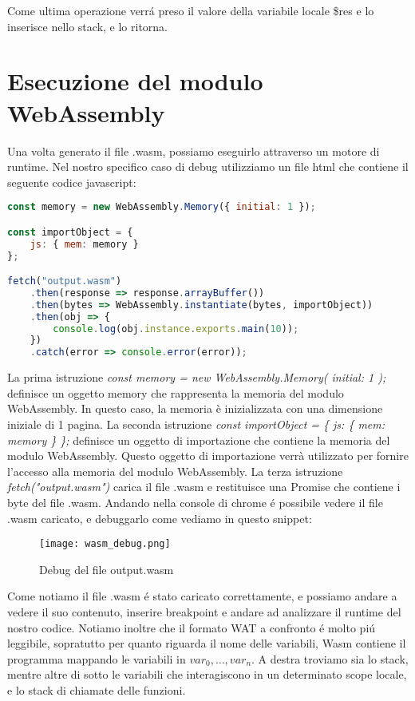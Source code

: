 \documentclass[../../main.tex]{subfiles}
\begin{document}
Come ultima operazione verrá preso il valore della variabile locale \$res e lo inserisce nello stack, e lo ritorna.

\section{Esecuzione del modulo WebAssembly}
Una volta generato il file .wasm, possiamo eseguirlo attraverso un motore di runtime. Nel nostro specifico caso di debug utilizziamo un file html che contiene il seguente codice javascript:
\begin{lstlisting}[language=Javascript, caption={Esecuzione del modulo WebAssembly}, label={lst:esecuzioneWasm}]
const memory = new WebAssembly.Memory({ initial: 1 });

const importObject = {
    js: { mem: memory }
};

fetch("output.wasm")
    .then(response => response.arrayBuffer())
    .then(bytes => WebAssembly.instantiate(bytes, importObject))
    .then(obj => {
        console.log(obj.instance.exports.main(10));
    })
    .catch(error => console.error(error));

\end{lstlisting}

La prima istruzione \textit{const memory = new WebAssembly.Memory({ initial: 1 });} definisce un oggetto memory che rappresenta la memoria del modulo WebAssembly. In questo caso, la memoria è inizializzata con una dimensione iniziale di 1 pagina.
La seconda istruzione \textit{const importObject = \{ js: \{ mem: memory \} \};} definisce un oggetto di importazione che contiene la memoria del modulo WebAssembly. Questo oggetto di importazione verrà utilizzato per fornire l'accesso alla memoria del modulo WebAssembly.
La terza istruzione \textit{fetch("output.wasm")} carica il file .wasm e restituisce una Promise che contiene i byte del file .wasm.
Andando nella console di chrome é possibile vedere il file .wasm caricato, e debuggarlo come vediamo in questo snippet:
\begin{figure}[H]
    \centering
    \texttt{[image: wasm\_debug.png]}
    \caption{Debug del file output.wasm}
    \label{fig:wasm_debug}
\end{figure}
Come notiamo il file .wasm é stato caricato correttamente, e possiamo andare a vedere il suo contenuto, inserire breakpoint e andare ad analizzare il runtime del nostro codice.
Notiamo inoltre che il formato WAT a confronto é molto piú leggibile, sopratutto per quanto riguarda il nome delle variabili, Wasm contiene il programma mappando le variabili in $var_0,\dots, var_n$.
A destra troviamo sia lo stack, mentre altre di sotto le variabili che interagiscono in un determinato scope locale, e lo stack di chiamate delle funzioni.
\end{document}
